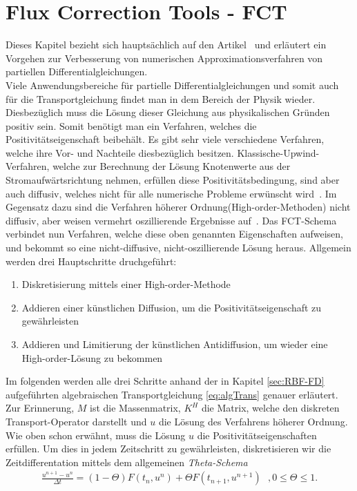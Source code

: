 \documentclass[a4paper,11pt]{article}
\begin{document}
\section{Flux Correction Tools - FCT}
Dieses Kapitel bezieht sich hauptsächlich auf den Artikel~\cite{kuzmin2002flux} und erläutert ein Vorgehen zur Verbesserung von numerischen Approximationsverfahren von partiellen Differentialgleichungen.\\
Viele Anwendungsbereiche für partielle Differentialgleichungen und somit auch für die Transportgleichung findet man in dem Bereich der Physik wieder. Diesbezüglich muss die Lösung dieser Gleichung aus physikalischen Gründen positiv sein. Somit benötigt man ein Verfahren, welches die Positivitätseigenschaft beibehält. Es gibt sehr viele verschiedene Verfahren, welche ihre Vor- und Nachteile diesbezüglich besitzen. Klassische-Upwind-Verfahren, welche zur Berechnung der Lösung Knotenwerte aus der Stromaufwärtsrichtung nehmen, erfüllen diese Positivitätsbedingung, sind aber auch diffusiv, welches nicht für alle numerische Probleme erwünscht wird~\cite{kuzmin2002flux}. Im Gegensatz dazu sind die Verfahren höherer Ordnung(High-order-Methoden) nicht diffusiv, aber weisen vermehrt oszillierende Ergebnisse auf~\cite{kuzmin2002flux}. Das FCT-Schema verbindet nun Verfahren, welche diese oben genannten Eigenschaften aufweisen, und bekommt so eine nicht-diffusive, nicht-oszillierende Lösung heraus. Allgemein werden drei Hauptschritte druchgeführt:
\begin{enumerate}
 \item Diskretisierung mittels einer High-order-Methode
 \item Addieren einer künstlichen Diffusion, um die Positivitätseigenschaft zu gewährleisten
 \item  Addieren und Limitierung der künstlichen Antidiffusion, um wieder eine High-order-Lösung zu bekommen
\end{enumerate}
Im folgenden werden alle drei Schritte anhand der in Kapitel \ref{sec:RBF-FD} aufgeführten algebraischen Transportgleichung \eqref{eq:algTrans} genauer erläutert. Zur Erinnerung, $M$ ist die Massenmatrix, $K^H$ die Matrix, welche den diskreten Transport-Operator darstellt und $u$ die Lösung des Verfahrens höherer Ordnung. Wie oben schon erwähnt, muss die Lösung $u$ die Positivitätseigenschaften erfüllen. Um dies in jedem Zeitschritt zu gewährleisten, diskretisieren wir die Zeitdifferentation mittels dem allgemeinen \textit{Theta-Schema}
\begin{align}
 \frac{u^{n+1}-u^n}{\Delta t}=(1-\Theta)F(t_n,u^n)+\Theta F(t_{n+1},u^{n+1})~~~,0\le\Theta\le1.
\end{align}
\end{document}
